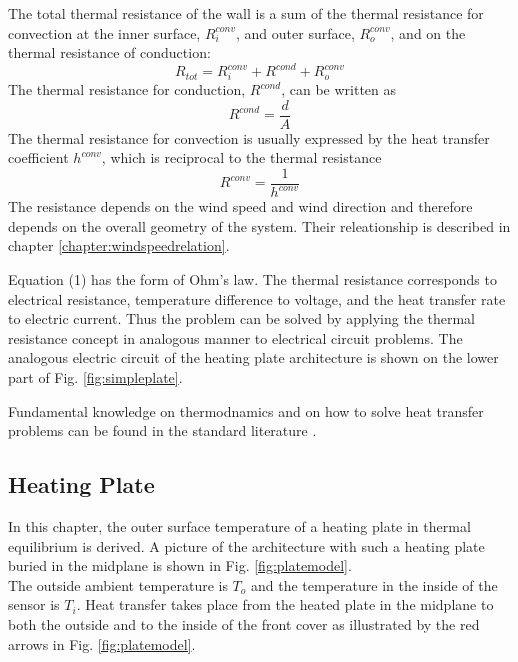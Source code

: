 The total thermal resistance of the wall is a sum of the thermal resistance for convection at the inner surface, \(R_i^{conv}\), and outer surface, \(R_o^{conv}\), and on the thermal resistance of conduction: 
\begin{equation}
R_{tot} =  R_i^{conv} + R^{cond} + R_o^{conv}
\end{equation}
The thermal resistance for conduction, \(R^{cond}\), can be written as
\begin{equation}
R^{cond} =  \frac{d}{A}
\end{equation}
The thermal resistance for convection is usually expressed by the heat transfer coefficient $h^{conv}$, which is reciprocal to the thermal resistance
\begin{equation}
R^{conv} =  \frac{1}{h^{conv}}
\end{equation}
The resistance depends on the wind speed and wind direction and therefore depends on the overall geometry of the system. Their releationship is described in chapter \ref{chapter:windspeedrelation}.

Equation (1) has the form of Ohm's law. The thermal resistance corresponds to electrical resistance, temperature difference to voltage, and the heat transfer rate to electric current. Thus the problem can be solved by applying the thermal resistance concept in analogous manner to electrical circuit problems. The analogous electric circuit of the heating plate architecture is shown on the lower part of Fig. \ref{fig:simpleplate}. 


Fundamental knowledge on thermodnamics and on how to solve heat transfer problems can be found in the standard literature \cite{Cengel2002,Cengel2014}. 

\subsection{Heating Plate}\label{chapter:heatingplate}
In this chapter, the outer surface temperature of a heating plate in thermal equilibrium is derived. A picture of the architecture with such a heating plate buried in the midplane is shown in Fig. \ref{fig:platemodel}. \\

The outside ambient temperature is $T_o$ and the temperature in the inside of the sensor is $T_i$. Heat transfer takes place from the heated plate in the midplane to both the outside and to the inside of the front cover as illustrated by the red arrows in Fig. \ref{fig:platemodel}. 

